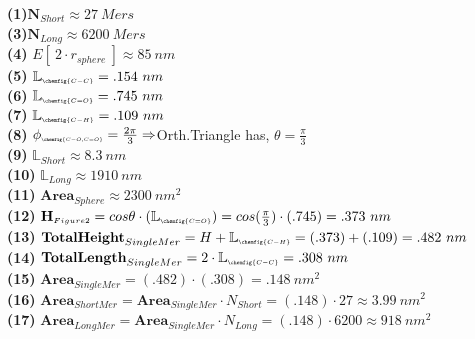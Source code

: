 \documentclass[10pt,letterpaper]{article}
\begin{document}
\noindent \textbf{(1)}$\textbf{N}_{Short} \approx 27~Mers$\\
\textbf{(3)}$\textbf{N}_{Long} \approx 6200~Mers$\\
\textbf{(4)} $E[~2\cdot r_{sphere}~]\approx 85~nm$\\
\textbf{(5)} $\mathbb{L}_{\scalebox{.82}{$\scriptscriptstyle \chemfig{C-C}$}}=.154~nm$\\
\textbf{(6)} $\mathbb{L}_{\scalebox{.82}{$\scriptscriptstyle \chemfig{C=O}$}}=.745~nm$\\
\textbf{(7)} $\mathbb{L}_{\scalebox{.82}{$\scriptscriptstyle \chemfig{C-H}$}}=.109~nm$\\
\textbf{(8)} $\phi_{\scalebox{.7}{$\scriptscriptstyle \chemfig{C-O,C=O}$}}=\frac{2\pi}{3}\Rightarrow$Orth.Triangle has, $\theta=\frac{\pi}{3}$\\
\textbf{(9)} $\mathbb{L}_{\scriptscriptstyle Short}\approx8.3~nm$\\
\textbf{(10)} $\mathbb{L}_{\scriptscriptstyle Long}\approx 1910~nm$\\
\textbf{(11)} $\textbf{Area}_{\scriptscriptstyle Sphere} \approx 2300~nm^2$\\
\textbf{(12)} $\textbf{H}_{\scriptscriptstyle Figure2}=cos\theta \cdot (\mathbb{L}_{\scalebox{.82}{$\scriptscriptstyle \chemfig{C=O}$}})=cos(\frac{\pi}{3}) \cdot(.745)=.373~nm$\\
\textbf{(13)} $\textbf{TotalHeight}_{SingleMer}=H+\mathbb{L}_{\scalebox{.82}{$\scriptscriptstyle \chemfig{C-H}$}}=(.373)+(.109)=.482~nm$\\
\textbf{(14)} $\textbf{TotalLength}_{SingleMer} = 2 \cdot \mathbb{L}_{\scalebox{.82}{$\scriptscriptstyle \chemfig{C-C}$}} = .308~nm$\\
\textbf{(15)} $\textbf{Area}_{\scriptscriptstyle SingleMer} =(.482) \cdot(.308) =.148~nm^2$\\
\textbf{(16)} $\textbf{Area}_{\scriptscriptstyle ShortMer} =\textbf{Area}_{\scriptscriptstyle SingleMer}\cdot N_{Short}=(.148)\cdot 27\approx 3.99 ~nm^2$\\
\textbf{(17)} $\textbf{Area}_{\scriptscriptstyle LongMer} =\textbf{Area}_{\scriptscriptstyle SingleMer}\cdot N_{Long}=(.148)\cdot 6200 \approx 918~nm^2$



\newpage

\end{document}
